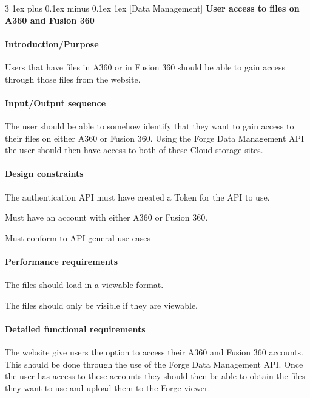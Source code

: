 \documentclass[letterpaper, 10pt, draftclsnofoot, compsoc, onecolumn]{IEEEtran}
\makeatletter
\def\subsubsection{\@startsection{subsubsection}%
                                 {3}%
                                 {\z@}%
                                 {1ex plus 0.1ex minus 0.1ex}%
                                 {1ex}%
                                 {\normalfont\normalsize}}%
\makeatother
\begin{document}
\subsubsection[{Data Management}]{\rmfamily\bfseries\color{black}  
	User access to files on A360 and Fusion 360
}

\paragraph[Introduction/Purpose of this
feature]{\rmfamily\bfseries\color{black}
Introduction/Purpose }
	Users that have files in A360 or in Fusion 360 should be able to gain access through those files from the
	website.

\paragraph[Input/Output sequence]{\rmfamily\bfseries\color{black}
Input/Output sequence }
	The user should be able to somehow identify that they want to gain access to their files on either A360
	or Fusion 360. Using the Forge Data Management API the user should then have access to both of these
	Cloud storage sites.

\paragraph[Design constraints]{\rmfamily\bfseries\color{black} Design
constraints }
	The authentication API must have created a Token for the API to use.

	Must have an account with either A360 or Fusion 360. 
	
	Must conform to API general use cases

\paragraph[Performance requirements]{\rmfamily\bfseries\color{black}
Performance requirements }
	The files should load in a viewable format.
	
	The files should only be visible if they are viewable.

\paragraph[Detailed functional requirements]{\rmfamily\bfseries\color{black}
Detailed functional requirements }
	The website give users the option to access their A360 and Fusion 360 accounts. This should be done through
	the use of the Forge Data Management API. Once the user has access to these accounts they should then be 
	able to obtain the files they want to use and upload them to the Forge viewer.
\end{document}

